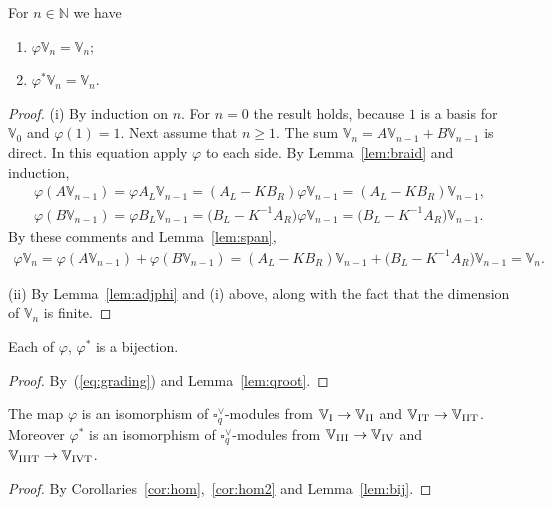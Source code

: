 \begin{Lemma}\label{lem:qroot}For $n \in \mathbb N$ we have
\begin{enumerate}\itemsep=0pt
\item[\rm (i)]
 $\varphi \mathbb V_n = \mathbb V_n$;
\item[\rm (ii)]
 $\varphi^* \mathbb V_n = \mathbb V_n$.
 \end{enumerate}
\end{Lemma}
\begin{proof}(i) By induction on $n$. For $n=0$ the result holds, because $1$ is a basis for $\mathbb V_0$ and $\varphi(1)=1$. Next assume that $n\geq 1$. The sum $\mathbb V_n= A \mathbb V_{n-1} + B \mathbb V_{n-1}$ is direct. In this equation apply $\varphi$ to each side. By Lemma~\ref{lem:braid} and induction,
\begin{gather*}
\varphi (A \mathbb V_{n-1})=\varphi A_L \mathbb V_{n-1}= (A_L - K B_R)\varphi \mathbb V_{n-1}
= (A_L - K B_R)\mathbb V_{n-1}, \\
\varphi (B \mathbb V_{n-1}) =\varphi B_L \mathbb V_{n-1} = \big(B_L - K^{-1} A_R\big)\varphi \mathbb V_{n-1}
= \big(B_L - K^{-1} A_R\big)\mathbb V_{n-1}.
\end{gather*}
By these comments and Lemma~\ref{lem:span},
\begin{gather*}
\varphi \mathbb V_n =\varphi (A \mathbb V_{n-1}) + \varphi (B \mathbb V_{n-1})
= (A_L - K B_R)\mathbb V_{n-1} +\big(B_L - K^{-1} A_R\big)\mathbb V_{n-1} = \mathbb V_n.
\end{gather*}

(ii) By Lemma~\ref{lem:adjphi} and (i) above, along with the fact that the dimension of $\mathbb V_n$ is finite.
\end{proof}

\begin{Lemma}\label{lem:bij}Each of $\varphi$, $\varphi^*$ is a bijection.
\end{Lemma}
\begin{proof}By~(\ref{eq:grading}) and Lemma~\ref{lem:qroot}.
\end{proof}

\begin{Proposition}\label{prop:expand}The map $\varphi$ is an isomorphism of $\square^\vee_q$-modules from
$\mathbb V_{\rm I} \to \mathbb V_{\rm II}$ and $\mathbb V_{\rm IT} \to\mathbb V_{\rm IIT}$. Moreover $\varphi^*$ is an isomorphism of $\square^\vee_q$-modules from $\mathbb V_{\rm III} \to \mathbb V_{\rm IV}$ and $\mathbb V_{\rm IIIT} \to \mathbb V_{\rm IVT}$.
\end{Proposition}
\begin{proof} By Corollaries~\ref{cor:hom},~\ref{cor:hom2} and Lemma~\ref{lem:bij}.
\end{proof}

